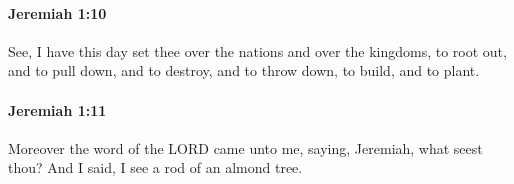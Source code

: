 		\paragraph{Jeremiah 1:10} %
			\label{JEREMIAH-1-10}

			See, I have this day set thee over the nations and over the kingdoms, to root out, and to pull down, and to destroy, and to throw down, to build, and to plant.


		\paragraph{Jeremiah 1:11} %
			\label{JEREMIAH-1-11}

			Moreover the word of the LORD came unto me, saying, Jeremiah, what seest thou? And I said, I see a rod of an almond tree.


